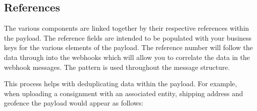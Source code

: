 \documentclass[letterpaper,10pt,english]{sphinxmanual}
\begin{document}
\subsection{References}
\label{\detokenize{loads/integration/import:references}}
The various components are linked together by their respective references within the payload. The reference fields are intended to be populated with your business keys for the various elements of the payload. The reference number will follow the data through into the webhooks which will allow you to correlate the data in the webhook messages. The pattern is used throughout the message structure.

This process helps with deduplicating data within the payload. For example, when uploading a consignment with an associated entity, shipping address and geofence the payload would appear as follows:

\begin{sphinxVerbatim}[commandchars=\\\{\}]
 \PYG{p}{[}
     
\PYG{p}{]}

 \PYG{p}{[}
     
     

\PYG{p}{]}
 \PYG{p}{[}
     

\PYG{p}{]}
 \PYG{p}{[}
     
     \PYG{p}{[}
         
         
         
    \PYG{p}{]}

\PYG{p}{]}

\end{sphinxVerbatim}
\end{document}
